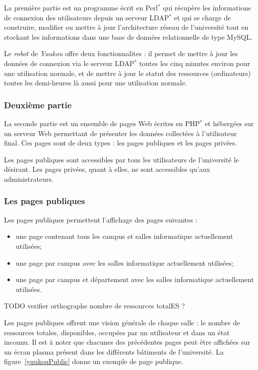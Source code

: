 La premi\`ere partie est un programme \'ecrit en Perl$^*$ qui r\'ecup\`ere les informations de connexion des utilisateurs depuis un serveur LDAP$^*$ et qui se charge de construire, modifier ou mettre \`a jour l'architecture r\'eseau de l'universit\'e tout en stockant les informations dans une base de donn\'ees relationnelle de type MySQL.

Le \textit{robot} de \textit{Yuukou} offre deux fonctionnalites : il permet de mettre \`a jour les donn\'ees de connexion via le serveur LDAP$^*$ toutes les cinq minutes environ pour une utilisation normale, et de mettre \`a jour le statut des ressources (ordinateurs) toutes les demi-heures l\`a aussi pour une utilisation normale.

\subsubsection{Deuxi\`eme partie}

La seconde partie est un ensemble de pages Web \'ecrites en PHP$^*$ et h\'eberg\'ees sur un serveur Web permettant de pr\'esenter les donn\'ees collect\'ees \`a l'utilisateur final.
Ces pages sont de deux types : les pages publiques et les pages priv\'ees.

Les pages publiques sont accessibles par tous les utilisateurs de l'universit\'e le d\'esirant.
Les pages priv\'ees, quant \`a elles, ne sont accessibles qu'aux administrateurs.

\subsubsection{Les pages publiques}

\noindent Les pages publiques permettent l'affichage des pages suivantes :
\begin{itemize}
	\item une page contenant tous les campus et salles informatique actuellement utilis\'ees;
	\item une page par campus avec les salles informatique actuellement utilis\'ees;
	\item une page par campus et d\'epartement avec les salles informatique actuellement utilis\'ees.

\end{itemize}

 TODO verifier orthographe nombre de ressources totalES ?

Les pages publiques offrent une vision g\'en\'erale de chaque salle : le nombre de ressources totales, disponibles, occup\'ees par un utilisateur et dans un \'etat inconnu.
Il est \`a noter que chacunes des pr\'ec\'edentes pages peut \^etre affich\'ees sur un \'ecran plasma pr\'esent dans les diff\'erents b\^atiments de l'universit\'e.
La figure~\ref{yuukouPublic} donne un exemple de page publique.

